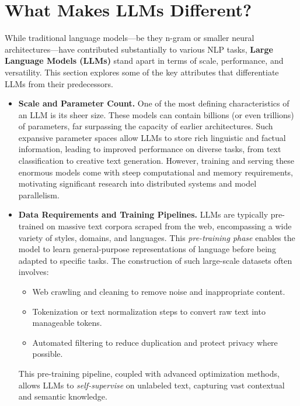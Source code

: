 \section{What Makes LLMs Different?}
\label{sec:llms_difference}

\noindent
While traditional language models—be they n-gram or smaller neural architectures—have contributed substantially to various NLP tasks, \textbf{Large Language Models (LLMs)} stand apart in terms of scale, performance, and versatility. This section explores some of the key attributes that differentiate LLMs from their predecessors.

\begin{itemize}
    \item \textbf{Scale and Parameter Count.}
    One of the most defining characteristics of an LLM is its sheer size. These models can contain billions (or even trillions) of parameters, far surpassing the capacity of earlier architectures. Such expansive parameter spaces allow LLMs to store rich linguistic and factual information, leading to improved performance on diverse tasks, from text classification to creative text generation. However, training and serving these enormous models come with steep computational and memory requirements, motivating significant research into distributed systems and model parallelism.

    \item \textbf{Data Requirements and Training Pipelines.}
    LLMs are typically pre-trained on massive text corpora scraped from the web, encompassing a wide variety of styles, domains, and languages. This \emph{pre-training phase} enables the model to learn general-purpose representations of language before being adapted to specific tasks. The construction of such large-scale datasets often involves:
    \begin{itemize}
        \item Web crawling and cleaning to remove noise and inappropriate content.
        \item Tokenization or text normalization steps to convert raw text into manageable tokens.
        \item Automated filtering to reduce duplication and protect privacy where possible.
    \end{itemize}
    This pre-training pipeline, coupled with advanced optimization methods, allows LLMs to \emph{self-supervise} on unlabeled text, capturing vast contextual and semantic knowledge.


\end{itemize}
